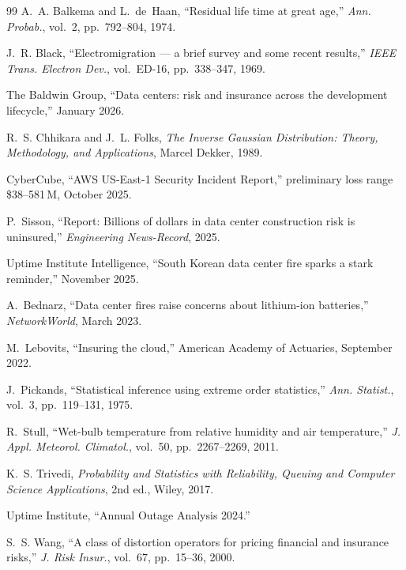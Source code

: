 \documentclass[11pt,a4paper]{article}
\theoremstyle{ia}
\newcommand{\1}{\mathbf{1}}
\begin{document}
\begin{thebibliography}{99}\small
{}
A.~A. Balkema and L.~de~Haan, ``Residual life time at great age,''
\textit{Ann. Probab.}, vol.~2, pp.~792--804, 1974.

J.~R. Black, ``Electromigration --- a brief survey and some recent
results,'' \textit{IEEE Trans. Electron Dev.}, vol.~ED-16,
pp.~338--347, 1969.

The Baldwin Group, ``Data centers: risk and insurance across the
development lifecycle,'' January 2026.

R.~S. Chhikara and J.~L. Folks, \textit{The Inverse Gaussian
Distribution: Theory, Methodology, and Applications}, Marcel Dekker,
1989.

CyberCube, ``AWS US-East-1 Security Incident Report,''
preliminary loss range \$38--581\,M, October 2025.

P.~Sisson, ``Report: Billions of dollars in data center construction
risk is uninsured,'' \textit{Engineering News-Record}, 2025.

Uptime Institute Intelligence, ``South Korean data center fire sparks
a stark reminder,'' November 2025.

A.~Bednarz, ``Data center fires raise concerns about lithium-ion
batteries,'' \textit{NetworkWorld}, March 2023.

M.~Lebovits, ``Insuring the cloud,'' American Academy of Actuaries,
September 2022.

J.~Pickands, ``Statistical inference using extreme order statistics,''
\textit{Ann. Statist.}, vol.~3, pp.~119--131, 1975.

R.~Stull, ``Wet-bulb temperature from relative humidity and air temperature,''
\textit{J. Appl. Meteorol. Climatol.}, vol.~50, pp.~2267--2269, 2011.

K.~S. Trivedi, \textit{Probability and Statistics with Reliability,
Queuing and Computer Science Applications}, 2nd ed., Wiley, 2017.

Uptime Institute, ``Annual Outage Analysis 2024.''

S.~S. Wang, ``A class of distortion operators for pricing financial
and insurance risks,'' \textit{J. Risk Insur.}, vol.~67,
pp.~15--36, 2000.
\end{thebibliography}
\end{document}
